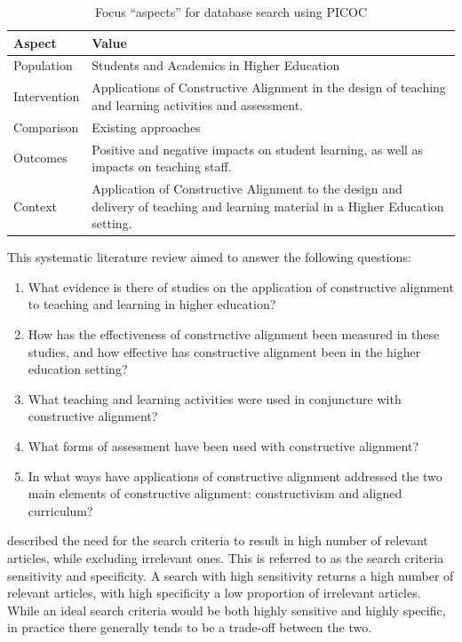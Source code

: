 \begin{table}[t]
	\renewcommand{\arraystretch}{1.2}
	\centering
	\caption{Focus ``aspects'' for database search using PICOC}
	\label{tbl:picoc}

    \begin{tabular}{l|p{9cm}}
    \textbf{Aspect} & \textbf{Value} \\
    \hline
    Population & Students and Academics in Higher Education\\
    Intervention & Applications of Constructive Alignment in the design of teaching and learning activities and assessment. \\
    Comparison & Existing approaches \\
    Outcomes & Positive and negative impacts on student learning, as well as impacts on teaching staff. \\
    Context & Application of Constructive Alignment to the design and delivery of teaching and learning material in a Higher Education setting. \\
    \end{tabular}
\end{table}


This systematic literature review aimed to answer the following questions:

\begin{enumerate}
	\item What evidence is there of studies on the application of constructive alignment to teaching and learning in higher education?
	\item How has the effectiveness of constructive alignment been measured in these studies, and how effective has constructive alignment been in the higher education setting?
	\item What teaching and learning activities were used in conjuncture with constructive alignment?
	\item What forms of assessment have been used with constructive alignment?
	\item In what ways have applications of constructive alignment addressed the two main elements of constructive alignment: constructivism and aligned curriculum?
\end{enumerate}

\citet{Petticrew:2008} described the need for the search criteria to result in high number of relevant articles, while excluding irrelevant ones. This is referred to as the search criteria sensitivity and specificity. A search with high sensitivity returns a high number of relevant articles, with high specificity a low proportion of irrelevant articles. While an ideal search criteria would be both highly sensitive and highly specific, in practice there generally tends to be a trade-off between the two. 

